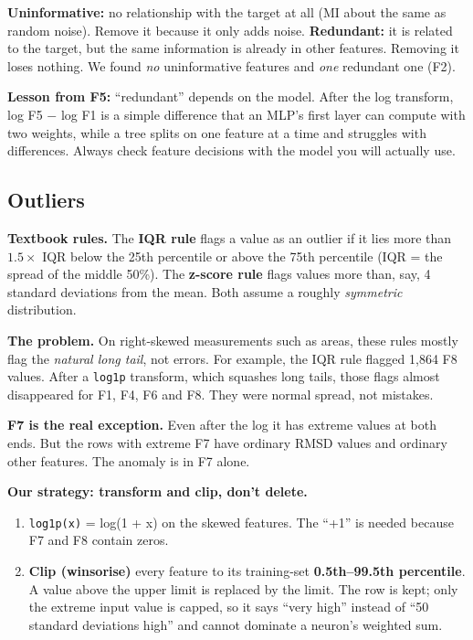 \documentclass[11pt,a4paper]{article}
\begin{document}
\begin{keyidea}
\textbf{Uninformative:} no relationship with the target at all (MI about the same as random noise). Remove it because it
only adds noise. \textbf{Redundant:} it is related to the target, but the same information is already in other features.
Removing it loses nothing. We found \emph{no} uninformative features and \emph{one} redundant one (F2).

\textbf{Lesson from F5:} ``redundant'' depends on the model. After the log transform, log F5 $-$ log F1 is a simple
difference that an MLP's first layer can compute with two weights, while a tree splits on one feature at a time and
struggles with differences. Always check feature decisions with the model you will actually use.
\end{keyidea}

\subsection{Outliers}
\textbf{Textbook rules.} The \textbf{IQR rule} flags a value as an outlier if it lies more than $1.5 \times$ IQR below the
25th percentile or above the 75th percentile (IQR = the spread of the middle 50\%). The \textbf{z-score rule} flags values
more than, say, 4 standard deviations from the mean. Both assume a roughly \emph{symmetric} distribution.

\textbf{The problem.} On right-skewed measurements such as areas, these rules mostly flag the \emph{natural long tail},
not errors. For example, the IQR rule flagged 1{,}864 F8 values. After a \texttt{log1p} transform, which squashes long
tails, those flags almost disappeared for F1, F4, F6 and F8. They were normal spread, not mistakes.

\textbf{F7 is the real exception.} Even after the log it has extreme values at both ends. But the rows with extreme F7
have ordinary RMSD values and ordinary other features. The anomaly is in F7 alone.

\textbf{Our strategy: transform and clip, don't delete.}
\begin{enumerate}
  \item \texttt{log1p(x)} = log(1 + x) on the skewed features. The ``+1'' is needed because F7 and F8 contain zeros.
  \item \textbf{Clip (winsorise)} every feature to its training-set \textbf{0.5th--99.5th percentile}. A value above the
        upper limit is replaced by the limit. The row is kept; only the extreme input value is capped, so it says
        ``very high'' instead of ``50 standard deviations high'' and cannot dominate a neuron's weighted sum.
\end{enumerate}
\end{document}
